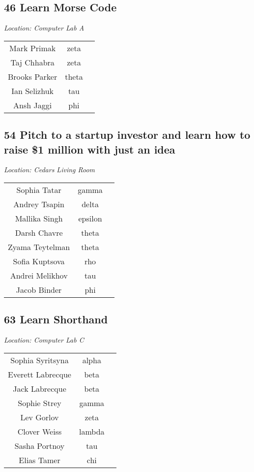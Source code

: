 \documentclass{article}
\begin{document}
\begin{center}
\section*{46 Learn Morse Code}
\end{center}
\begin{center}
\textit{Location: Computer Lab A}
\end{center}
\setlength{\tabcolsep}{60pt}
\centering
\begin{tabular}{c c c}
Mark Primak & zeta \\
Taj Chhabra & zeta \\
Brooks Parker & theta \\
Ian Selizhuk & tau \\
Ansh Jaggi & phi \\
\end{tabular}
\begin{center}
\section*{54 Pitch to a startup investor and learn how to raise \$1 million with just an idea}
\end{center}
\begin{center}
\textit{Location: Cedars Living Room}
\end{center}
\setlength{\tabcolsep}{60pt}
\centering
\begin{tabular}{c c c}
Sophia Tatar & gamma \\
Andrey Tsapin & delta \\
Mallika Singh & epsilon \\
Darsh Chavre & theta \\
Zyama Teytelman & theta \\
Sofia Kuptsova & rho \\
Andrei Melikhov & tau \\
Jacob Binder & phi \\
\end{tabular}
\pagebreak
\begin{center}
\section*{63 Learn Shorthand}
\end{center}
\begin{center}
\textit{Location: Computer Lab C}
\end{center}
\setlength{\tabcolsep}{60pt}
\centering
\begin{tabular}{c c c}
Sophia Syritsyna & alpha \\
Everett Labrecque & beta \\
Jack Labrecque & beta \\
Sophie Strey & gamma \\
Lev Gorlov & zeta \\
Clover Weiss & lambda \\
Sasha Portnoy & tau \\
Elias Tamer & chi \\
\end{tabular}
\end{document}
